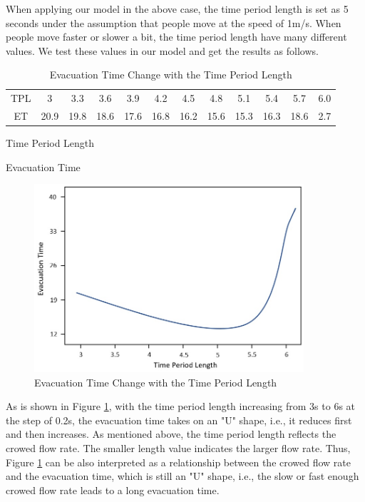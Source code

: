 \documentclass[a4paper,12pt]{article}
\begin{document}
When applying our model in the above case, the time period length is set as 5 seconds under the assumption that people move at the speed of 1m/s. When people move faster or slower a bit, the time period length have many different values. We test these values in our model and get the results as follows.
\begin{table}[ht]
  \caption{Evacuation Time Change with the Time Period Length}
  \label{tab3}
  \centering
  \begin{threeparttable}
    \setlength{\extrarowheight}{2mm}
    \begin{tabular}{|c|ccccccccccc|}
    \hline
    \rowcolor[gray]{0.9}
    TPL\tnote{1}&3    & 3.3  & 3.6  & 3.9  & 4.2  & 4.5  & 4.8  & 5.1  & 5.4 & 5.7  & 6.0 \\
    \rowcolor{mycyan}
    ET \tnote{2}&20.9 & 19.8 & 18.6 & 17.6 & 16.8 & 16.2 & 15.6 & 15.3 & 16.3& 18.6 & 2.7\\
    \hline
    \end{tabular}
        \begin{tablenotes}
        \footnotesize
        \item[1] Time Period Length
        \item[2] Evacuation Time
      \end{tablenotes}
          \end{threeparttable}
\end{table}

\begin{figure} [H]
\centering
\includegraphics[width=10cm]{time_period.jpg}
\caption{Evacuation Time Change with the Time Period Length}
\label{fig8}
\end{figure}

As is shown in Figure \ref{fig8}, with the time period length increasing from 3s to 6s at the step of 0.2s, the evacuation time takes on an "U" shape, i.e., it reduces first and then increases. As mentioned above, the time period length reflects the crowed flow rate. The smaller length value indicates the larger flow rate. Thus, Figure \ref{fig8} can be also interpreted as a relationship between the crowed flow rate and the evacuation time, which is still an "U" shape, i.e., the slow or fast enough crowed flow rate leads to a long evacuation time.
\end{document}
